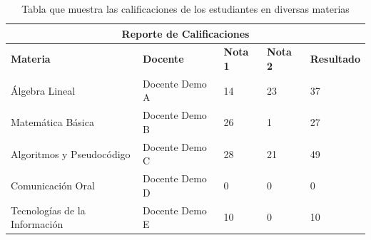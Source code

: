 \begin{table}[h]
        \centering
        \begin{tabularx}{\textwidth}{|X|X|X|X|p{5cm}|}
        \hline
        \multicolumn{5}{|c|}{\textbf{Reporte de Calificaciones}}\\\hline
        \textbf{Materia} & \textbf{Docente} & \textbf{Nota 1} & \textbf{Nota 2} & \textbf{Resultado} \\ \hline
        Álgebra Lineal & Docente Demo A & 14 & 23 & 37 \\ \hline
        Matemática Básica & Docente Demo B & 26 & 1 & 27 \\ \hline
        Algoritmos y Pseudocódigo & Docente Demo C & 28 & 21 & 49 \\ \hline
        Comunicación Oral & Docente Demo D & 0 & 0 & 0 \\ \hline
        Tecnologías de la Información & Docente Demo E & 10 & 0 & 10 \\ \hline
        \end{tabularx}
        \caption{Tabla que muestra las calificaciones de los estudiantes en diversas materias}
        \end{table}